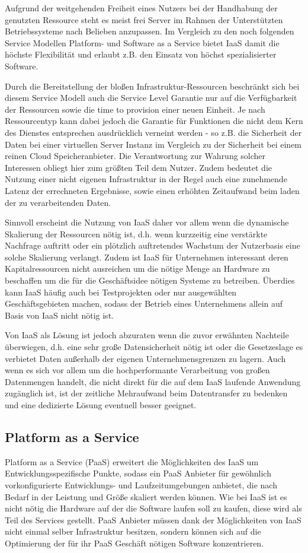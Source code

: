 \documentclass[journal]{IEEEtran}
\begin{document}
Aufgrund der weitgehenden Freiheit eines Nutzers bei der Handhabung der genutzten Ressource steht es meist frei Server im Rahmen der Unterstützten Betriebssysteme nach Belieben anzupassen. Im Vergleich zu den noch folgenden Service Modellen Platform- und Software as a Service bietet IaaS damit die höchste Flexibilität und erlaubt z.B. den Einsatz von höchst spezialisierter Software.

Durch die Bereitstellung der bloßen Infrastruktur-Ressourcen beschränkt sich bei diesem Service Modell auch die Service Level Garantie nur auf die Verfügbarkeit der Ressourcen sowie die time to provision einer neuen Einheit. Je nach Ressourcentyp kann dabei jedoch die Garantie für Funktionen die nicht dem Kern des Dienstes entsprechen ausdrücklich verneint werden - so z.B. die Sicherheit der Daten bei einer virtuellen Server Instanz im Vergleich zu der Sicherheit bei einem reinen Cloud Speicheranbieter. Die Verantwortung zur Wahrung solcher Interessen obliegt hier zum größten Teil dem Nutzer. Zudem bedeutet die Nutzung einer nicht eigenen Infrastruktur in der Regel auch eine zunehmende Latenz der errechneten Ergebnisse, sowie einen erhöhten Zeitaufwand beim laden der zu verarbeitenden Daten.

Sinnvoll erscheint die Nutzung von IaaS daher vor allem wenn die dynamische Skalierung der Ressourcen nötig ist, d.h. wenn kurzzeitig eine verstärkte Nachfrage auftritt oder ein plötzlich auftretendes Wachstum der Nutzerbasis eine solche Skalierung verlangt. Zudem ist IaaS für Unternehmen interessant deren Kapitalressourcen nicht ausreichen um die nötige Menge an Hardware zu beschaffen um die für die Geschäftsidee nötigen Systeme zu betreiben. Überdies kann IaaS häufig auch bei Testprojekten oder nur ausgewählten Geschäftsgebieten machen, sodass der Betrieb eines Unternehmens allein auf Basis von IaaS nicht nötig ist.

Von IaaS als Lösung ist jedoch abzuraten wenn die zuvor erwähnten Nachteile überwiegen, d.h. eine sehr große Datensicherheit nötig ist oder die Gesetzeslage es verbietet Daten außerhalb der eigenen Unternehmensgrenzen zu lagern. Auch wenn es sich vor allem um die hochperformante Verarbeitung von großen Datenmengen handelt, die nicht direkt für die auf dem IaaS laufende Anwendung zugänglich ist, ist der zeitliche Mehraufwand beim Datentransfer zu bedenken und eine dedizierte Lösung eventuell besser geeignet. 

\subsection{Platform as a Service}
Platform as a Service (PaaS) erweitert die Möglichkeiten des IaaS um Entwicklungsspezifische Punkte, sodass ein PaaS Anbieter für gewöhnlich vorkonfigurierte Entwicklungs- und Laufzeitumgebungen anbietet, die nach Bedarf in der Leistung und Größe skaliert werden können. Wie bei IaaS ist es nicht nötig die Hardware auf der die Software laufen soll zu kaufen, diese wird als Teil des Services gestellt. PaaS Anbieter müssen dank der Möglichkeiten von IaaS nicht einmal selber Infrastruktur besitzen, sondern können sich auf die Optimierung der für ihr PaaS Geschäft nötigen Software konzentrieren. 
\end{document}
